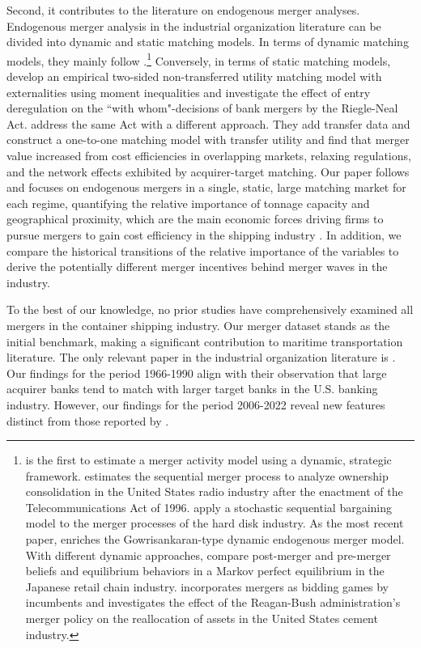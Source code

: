 \documentclass[10pt]{article}
\begin{document}
Second, it contributes to the literature on endogenous merger analyses. 
Endogenous merger analysis in the industrial organization literature can be divided into dynamic and static matching models. 
In terms of dynamic matching models, they mainly follow \cite{gowrisankaran1999dynamic}.\footnote{\cite{stahl2011dynamic} is the first to estimate a merger activity model using a dynamic, strategic framework. \cite{jeziorski2014effects} estimates the sequential merger process to analyze ownership consolidation in the United States radio industry after the enactment of the Telecommunications Act of 1996. \cite{igami2019mergers} apply a stochastic sequential bargaining model to the merger processes of the hard disk industry. As the most recent paper, \cite{hollenbeck2020horizontal} enriches the Gowrisankaran-type dynamic endogenous merger model. With different dynamic approaches, \cite{nishida2015better} compare post-merger and pre-merger beliefs and equilibrium behaviors in a Markov perfect equilibrium in the Japanese retail chain industry. \cite{perez2015building} incorporates mergers as bidding games by incumbents and investigates the effect of the Reagan-Bush administration's merger policy on the reallocation of assets in the United States cement industry.} 
Conversely, in terms of static matching models, \cite{uetake2019entry} develop an empirical two-sided non-transferred utility matching model with externalities using moment inequalities and investigate the effect of entry deregulation on the ``with whom"-decisions of bank mergers by the Riegle-Neal Act. 
\cite{akkus2015ms} address the same Act with a different approach. 
They add transfer data and construct a one-to-one matching model with transfer utility and find that merger value increased from cost efficiencies in overlapping markets, relaxing regulations, and the network effects exhibited by acquirer-target matching. 
Our paper follows \cite{akkus2015ms} and focuses on endogenous mergers in a single, static, large matching market for each regime, quantifying the relative importance of tonnage capacity and geographical proximity, which are the main economic forces driving firms to pursue mergers to gain cost efficiency in the shipping industry \citep{notteboom2004container}.
In addition, we compare the historical transitions of the relative importance of the variables to derive the potentially different merger incentives behind merger waves in the industry.

To the best of our knowledge, no prior studies have comprehensively examined all mergers in the container shipping industry. Our merger dataset stands as the initial benchmark, making a significant contribution to maritime transportation literature. The only relevant paper in the industrial organization literature is \cite{akkus2015ms}. Our findings for the period 1966-1990 align with their observation that large acquirer banks tend to match with larger target banks in the U.S. banking industry. However, our findings for the period 2006-2022 reveal new features distinct from those reported by \cite{akkus2015ms}.
\end{document}
